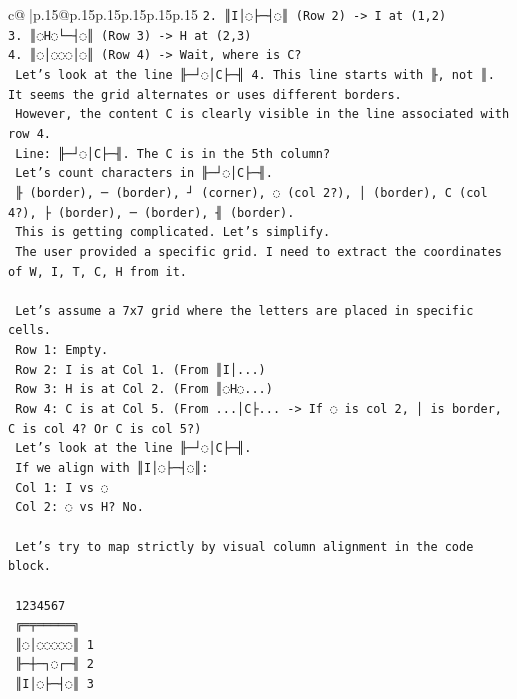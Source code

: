 \documentclass{article}
\begin{document}
{\begin{supertabular}{c@{$\;$}|p{.15\linewidth}@{}p{.15\linewidth}p{.15\linewidth}p{.15\linewidth}p{.15\linewidth}p{.15\linewidth}}
{{{\texttt{2. ║I│◌├─┤◌║ (Row 2) {-}> I at (1,2)} \\
\texttt{3. ║◌H◌└─┤◌║ (Row 3) {-}> H at (2,3)} \\
\texttt{4. ║◌│◌◌◌│◌║ (Row 4) {-}> Wait, where is C?} \\
\texttt{   Let's look at the line ╟─┘◌│C├─╢ 4. This line starts with ╟, not ║. It seems the grid alternates or uses different borders.} \\
\texttt{   However, the content C is clearly visible in the line associated with row 4.} \\
\texttt{   Line: ╟─┘◌│C├─╢. The C is in the 5th column?} \\
\texttt{   Let's count characters in ╟─┘◌│C├─╢.} \\
\texttt{   ╟ (border), ─ (border), ┘ (corner), ◌ (col 2?), │ (border), C (col 4?), ├ (border), ─ (border), ╢ (border).} \\
\texttt{   This is getting complicated. Let's simplify.} \\
\texttt{   The user provided a specific grid. I need to extract the coordinates of W, I, T, C, H from it.} \\
\\ 
\texttt{   Let's assume a 7x7 grid where the letters are placed in specific cells.} \\
\texttt{   Row 1: Empty.} \\
\texttt{   Row 2: I is at Col 1. (From ║I│...)} \\
\texttt{   Row 3: H is at Col 2. (From ║◌H◌...)} \\
\texttt{   Row 4: C is at Col 5. (From ...│C├... {-}> If ◌ is col 2, │ is border, C is col 4? Or C is col 5?)} \\
\texttt{   Let's look at the line ╟─┘◌│C├─╢.} \\
\texttt{   If we align with ║I│◌├─┤◌║:} \\
\texttt{   Col 1: I vs ◌} \\
\texttt{   Col 2: ◌ vs H? No.} \\
\\ 
\texttt{   Let's try to map strictly by visual column alignment in the code block.} \\
\\ 
\texttt{    1234567} \\
\texttt{   ╔═╤═════╗} \\
\texttt{   ║◌│◌◌◌◌◌║ 1} \\
\texttt{   ╟─┼─┐◌┌─╢ 2} \\
\texttt{   ║I│◌├─┤◌║ 3} \\
}}}
\end{supertabular}}
\end{document}
